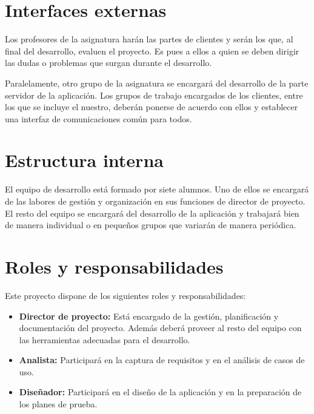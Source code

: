 \section{Interfaces externas}

Los profesores de la asignatura harán las partes de clientes y serán los que, al
final del desarrollo, evaluen el proyecto. Es pues a ellos a quien se deben
dirigir las dudas o problemas que surgan durante el desarrollo.

Paralelamente, otro grupo de la asignatura se encargará del desarrollo de la
parte servidor de la aplicación. Los grupos de trabajo encargados de los
clientes, entre los que se incluye el nuestro, deberán ponerse de acuerdo con
ellos y establecer una interfaz de comunicaciones común para todos.

\section{Estructura interna}

El equipo de desarrollo está formado por siete alumnos. Uno de ellos se
encargará de las labores de gestión y organización en sus funciones de director
de proyecto. El resto del equipo se encargará del desarrollo de la aplicación y
trabajará bien de manera individual o en pequeños grupos que variarán de manera
periódica.

\section{Roles y responsabilidades}

Este proyecto dispone de los siguientes roles y responsabilidades:
\begin{itemize}
\item \textbf{Director de proyecto:} Está encargado de la gestión,
planificación y documentación del proyecto. Además deberá proveer al resto del
equipo con las herramientas adecuadas para el desarrollo.
\item \textbf{Analista:} Participará en la captura de requisitos y en el
análisis de casos de uso.
\item \textbf{Diseñador:} Participará en el diseño de la aplicación y en la
preparación de los planes de prueba.
\end{itemize}

